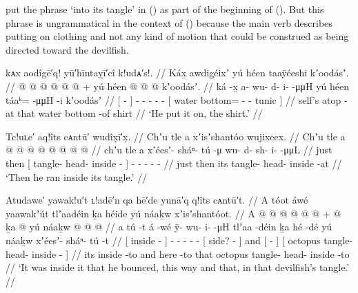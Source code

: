 \citeauthor{swanton:1909} put the phrase   ‘into its tangle’ in (\lastx) as part of the beginning of (\nextx).
But this phrase is ungrammatical in the context of (\nextx) because the main verb describes putting on clothing and not any kind of motion that could be construed as being directed toward the devilfish.

\ex\label{ex:91-209-put-on-shirt}%
%
\begingl
	\glpreamble	kᴀx aodîgē′q! yū′hīntaỵī′cî k!udᴀ′s!. //
	\glpreamble	Káx̱ awdig̱éixʼ yú héen taaÿéeshi kʼoodásʼ. //
	\gla	{} {}  @ {} {}
		 @ {} @ {} @ {} @ {} @ {} +
		{} yú héen  @ {} @ {} @ {} kʼoodásʼ. {} //
	\glb	{} {} ká -x̱ {}
		a- wu- d- i-  -μμH
		{} yú héen táaᵏ=  -μμH -i kʼoodásʼ {} //
	\glc	{}[   - {}]
		- - - -  -
		{}[  water bottom=  - - tunic {}] //
	\gld	{} self’s atop -at {}
		 {} {} {} {} {}
		{} that water bottom  {} -of shirt {} //
	\glft	‘He put it on, the  shirt.’
		//
\endgl
\xe

\ex\label{ex:91-210-ran-inside-tangle}%
%
\begingl
	\glpreamble	Tc!uʟe′ aq!îts cᴀntū′ wudîx̣ī′x̣. //
	\glpreamble	Chʼu tle a xʼisʼshantóo wujixeex. //
	\gla	Chʼu tle {} a  @ {} @ {} @ {} {}
		 @ {} @ {} @ {} @ {} @ {} //
	\glb	chʼu tle {} a xʼéesʼ- sháⁿ- tú -μ {}
		wu- d- sh- i-  -μμL //
	\glc	just then {}[  tangle- head- inside - {}]
		- - - -  - //
	\gld	just then {} its tangle- head- inside -at {}
		 {} {} {} {} {} //
	\glft	‘Then he ran inside its tangle.’
		//
\endgl
\xe

\ex\label{ex:91-211-bounce-around-tangle}%
%
\begingl
	\glpreamble	Atudawe′ yawak!u′t ʟ!adē′n qa hē′de yunā′q q!îts cᴀntū′t. //
	\glpreamble	A tóot áwé yaawakʼút tlʼaadéin ḵa héide yú náaḵw xʼisʼshantóot. //
	\gla	{} A  @ {} {}  @ {} 
		 @ {} @ {} @ {} @ {} +
		{}  @ {} {}
		ḵa  {}  @ {} {}
		{} yú náaḵw  @ {} @ {} @ {} {} //
	\glb	{} a tú -t {} á -wé
		ÿ- wu- i-  -μH
		{} tlʼaa -déin {}
		ḵa {} hé -dé {}
		{} yú náaḵw xʼéesʼ- sháⁿ- tú -t {} //
	\glc	{}[  inside - {}]  -
		- - -  -
		{}[ side? - {}]
		and {}[  - {}]
		{}[  octopus tangle- head- inside - {}] //
	\gld	{} its inside -to {}  {}
		 {} {} {} {}
		{}  {} {}
		and {} here -to {}
		{} that octopus tangle- head- inside -to {} //
	\glft	‘It was inside it that he bounced, this way and that, in that devilfish’s tangle.’
		//
\endgl
\xe

